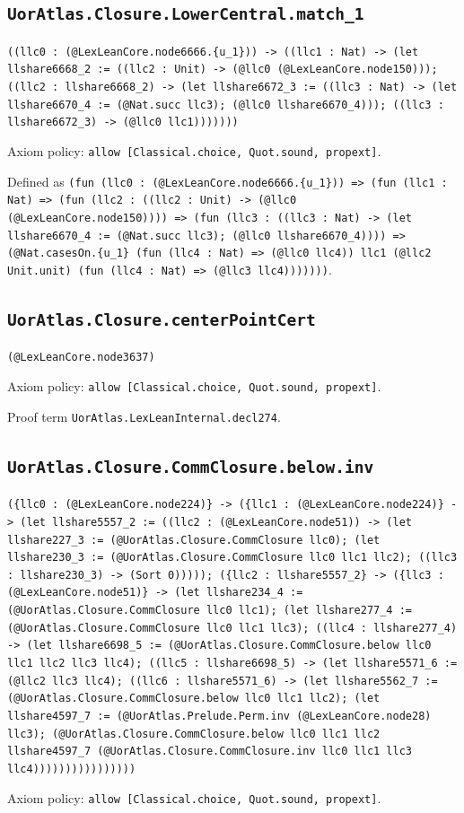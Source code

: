 \documentclass[11pt]{article}
\begin{document}
\subsection*{\texttt{UorAtlas.Closure.LowerCentral.match\_1}}
\noindent\texttt{((llc0 : (@LexLeanCore.node6666.\{u\_1\})) -> ((llc1 : Nat) -> (let llshare6668\_2 := ((llc2 : Unit) -> (@llc0 (@LexLeanCore.node150))); ((llc2 : llshare6668\_2) -> (let llshare6672\_3 := ((llc3 : Nat) -> (let llshare6670\_4 := (@Nat.succ llc3); (@llc0 llshare6670\_4))); ((llc3 : llshare6672\_3) -> (@llc0 llc1)))))))}\par
\noindent Axiom policy: \texttt{allow [Classical.choice, Quot.sound, propext]}.\par
\noindent Defined as \texttt{(fun (llc0 : (@LexLeanCore.node6666.\{u\_1\})) => (fun (llc1 : Nat) => (fun (llc2 : ((llc2 : Unit) -> (@llc0 (@LexLeanCore.node150)))) => (fun (llc3 : ((llc3 : Nat) -> (let llshare6670\_4 := (@Nat.succ llc3); (@llc0 llshare6670\_4)))) => (@Nat.casesOn.\{u\_1\} (fun (llc4 : Nat) => (@llc0 llc4)) llc1 (@llc2 Unit.unit) (fun (llc4 : Nat) => (@llc3 llc4)))))))}.\par
\subsection*{\texttt{UorAtlas.Closure.centerPointCert}}
\noindent\texttt{(@LexLeanCore.node3637)}\par
\noindent Axiom policy: \texttt{allow [Classical.choice, Quot.sound, propext]}.\par
\noindent Proof term \texttt{UorAtlas.LexLeanInternal.decl274}.\par
\subsection*{\texttt{UorAtlas.Closure.CommClosure.below.inv}}
\noindent\texttt{(\{llc0 : (@LexLeanCore.node224)\} -> (\{llc1 : (@LexLeanCore.node224)\} -> (let llshare5557\_2 := ((llc2 : (@LexLeanCore.node51)) -> (let llshare227\_3 := (@UorAtlas.Closure.CommClosure llc0); (let llshare230\_3 := (@UorAtlas.Closure.CommClosure llc0 llc1 llc2); ((llc3 : llshare230\_3) -> (Sort 0))))); (\{llc2 : llshare5557\_2\} -> (\{llc3 : (@LexLeanCore.node51)\} -> (let llshare234\_4 := (@UorAtlas.Closure.CommClosure llc0 llc1); (let llshare277\_4 := (@UorAtlas.Closure.CommClosure llc0 llc1 llc3); ((llc4 : llshare277\_4) -> (let llshare6698\_5 := (@UorAtlas.Closure.CommClosure.below llc0 llc1 llc2 llc3 llc4); ((llc5 : llshare6698\_5) -> (let llshare5571\_6 := (@llc2 llc3 llc4); ((llc6 : llshare5571\_6) -> (let llshare5562\_7 := (@UorAtlas.Closure.CommClosure.below llc0 llc1 llc2); (let llshare4597\_7 := (@UorAtlas.Prelude.Perm.inv (@LexLeanCore.node28) llc3); (@UorAtlas.Closure.CommClosure.below llc0 llc1 llc2 llshare4597\_7 (@UorAtlas.Closure.CommClosure.inv llc0 llc1 llc3 llc4))))))))))))))))}\par
\noindent Axiom policy: \texttt{allow [Classical.choice, Quot.sound, propext]}.\par
\end{document}
